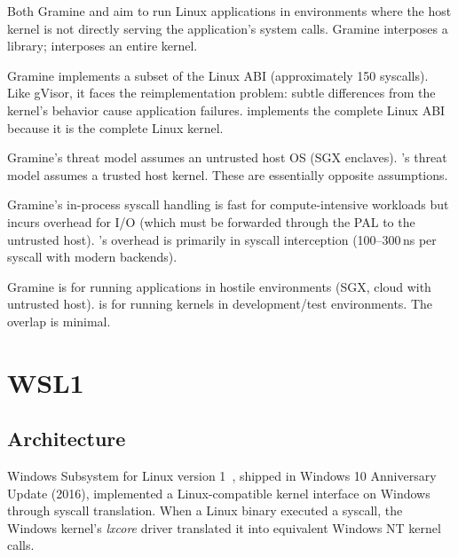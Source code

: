 \begin{description}[style=nextline,leftmargin=2em]
  \item[Shared goal.]
    Both Gramine and \UML{} aim to run Linux applications in
    environments where the host kernel is not directly serving
    the application's system calls.  Gramine interposes a library;
    \UML{} interposes an entire kernel.

  \item[Compatibility.]
    Gramine implements a subset of the Linux ABI (approximately
    150 syscalls).  Like gVisor, it faces the reimplementation
    problem: subtle differences from the kernel's behavior cause
    application failures.  \UML{} implements the complete Linux
    ABI because it is the complete Linux kernel.

  \item[Threat model.]
    Gramine's threat model assumes an untrusted host OS (SGX
    enclaves).  \UML{}'s threat model assumes a trusted host
    kernel.  These are essentially opposite assumptions.

  \item[Performance.]
    Gramine's in-process syscall handling is fast for
    compute-intensive workloads but incurs overhead for I/O
    (which must be forwarded through the PAL to the untrusted
    host).  \UML{}'s overhead is primarily in syscall interception
    (100--300\,ns per syscall with modern backends).

  \item[Use case.]
    Gramine is for running applications in hostile environments
    (SGX, cloud with untrusted host).  \UML{} is for running
    kernels in development/test environments.  The overlap is
    minimal.
\end{description}


\section{WSL1}
\label{sec:related-wsl1}

\subsection{Architecture}

Windows Subsystem for Linux version 1~\cite{wsl1}, shipped in
Windows 10 Anniversary Update (2016), implemented a Linux-compatible
kernel interface on Windows through syscall translation.  When a
Linux binary executed a syscall, the Windows kernel's \emph{lxcore}
driver translated it into equivalent Windows NT kernel calls.

